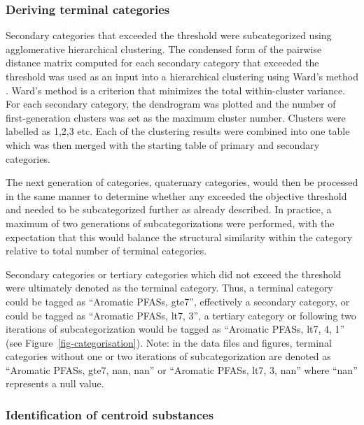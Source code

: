 \documentclass[
  super,
  preprint,
  3p]{elsarticle}
\begin{document}
\hypertarget{sec-terminal}{%
\subsubsection{Deriving terminal categories}\label{sec-terminal}}

Secondary categories that exceeded the threshold were subcategorized
using agglomerative hierarchical clustering. The condensed form of the
pairwise distance matrix computed for each secondary category that
exceeded the threshold was used as an input into a hierarchical
clustering using Ward's method \citep{ward_hierarchical_1963}. Ward's
method is a criterion that minimizes the total within-cluster variance.
For each secondary category, the dendrogram was plotted and the number
of first-generation clusters was set as the maximum cluster number.
Clusters were labelled as 1,2,3 etc. Each of the clustering results were
combined into one table which was then merged with the starting table of
primary and secondary categories.

The next generation of categories, quaternary categories, would then be
processed in the same manner to determine whether any exceeded the
objective threshold and needed to be subcategorized further as already
described. In practice, a maximum of two generations of
subcategorizations were performed, with the expectation that this would
balance the structural similarity within the category relative to total
number of terminal categories.

Secondary categories or tertiary categories which did not exceed the
threshold were ultimately denoted as the terminal category. Thus, a
terminal category could be tagged as ``Aromatic PFASs, gte7'',
effectively a secondary category, or could be tagged as ``Aromatic
PFASs, lt7, 3'', a tertiary category or following two iterations of
subcategorization would be tagged as ``Aromatic PFASs, lt7, 4, 1'' (see
Figure~\ref{fig-categorisation}). Note: in the data files and figures,
terminal categories without one or two iterations of subcategorization
are denoted as ``Aromatic PFASs, gte7, nan, nan'' or ``Aromatic PFASs,
lt7, 3, nan'' where ``nan'' represents a null value.

\hypertarget{sec-centroid}{%
\subsubsection{Identification of centroid
substances}\label{sec-centroid}}
\end{document}

